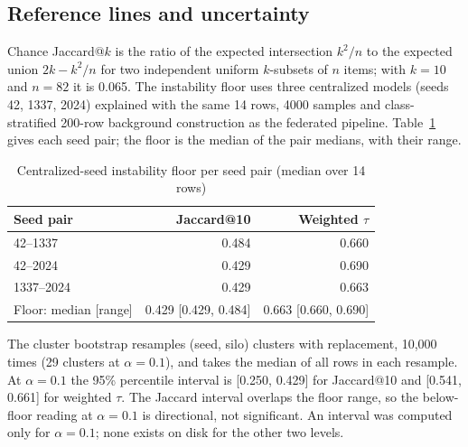 \subsection{Reference lines and uncertainty}
Chance Jaccard@$k$ is the ratio of the expected intersection $k^2/n$ to the expected
union $2k-k^2/n$ for two independent uniform $k$-subsets of $n$ items; with $k=10$ and %
$n=82$ it is 0.065. The instability floor uses three centralized models (seeds 42, 1337, %
2024) explained with the same 14 rows, 4000 samples and class-stratified 200-row %
background construction as the federated pipeline. Table~\ref{tab:floor} gives each seed
pair; the floor is the median of the pair medians, with their range.

\begin{table}[h]
\centering
\caption{Centralized-seed instability floor per seed pair (median over 14 rows)} %
\label{tab:floor}
\footnotesize
\begin{tabular}{@{}lrr@{}}
\toprule
Seed pair & Jaccard@10 & Weighted $\tau$\\
\midrule
42--1337 & 0.484 & 0.660\\ %
42--2024 & 0.429 & 0.690\\ %
1337--2024 & 0.429 & 0.663\\ %
Floor: median [range] & 0.429 [0.429, 0.484] & 0.663 [0.660, 0.690]\\ %
\bottomrule
\end{tabular}
\end{table}

The cluster bootstrap resamples (seed, silo) clusters with replacement, 10,000 times %
(29 clusters at $\alpha=0.1$), and takes the median of all rows in each resample. At %
$\alpha=0.1$ the 95\% percentile interval is [0.250, 0.429] for Jaccard@10 and %
[0.541, 0.661] for weighted $\tau$. The Jaccard interval overlaps the floor range, so the %
below-floor reading at $\alpha=0.1$ is directional, not significant. An interval was %
computed only for $\alpha=0.1$; none exists on disk for the other two levels. %

